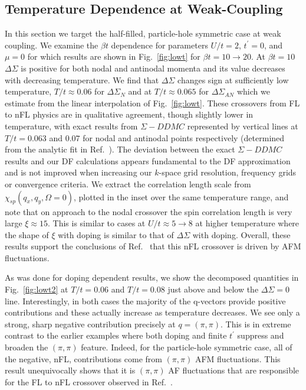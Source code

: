 \documentclass[twocolumn,notitlepage,prb,superscriptaddress,showpacs]{revtex4-1}
\begin{document}
\subsection{Temperature Dependence at Weak-Coupling}
In this section we target the half-filled, particle-hole symmetric case at weak coupling.  We examine the $\beta t$ dependence for parameters $U/t=2$, $t^\prime=0$, and $\mu=0$ for which results are shown in Fig.~\ref{fig:lowt} for $\beta t=10 \to 20$. 
At $\beta t=10$ $\Delta \Sigma$ is positive for both nodal and antinodal momenta and its value decreases with decreasing temperature.
 We find that $\Delta\Sigma$ changes sign at sufficiently low temperature, $T/t\approx0.06$ for $\Delta \Sigma_N$ and at $T/t\approx0.065$ for $\Delta \Sigma_{AN}$ which we estimate from the linear interpolation of Fig.~\ref{fig:lowt}.  
 These crossovers from FL to nFL physics are in qualitative agreement, though slightly lower in temperature, with exact results from $\Sigma-DDMC$\cite{simkovic:2019} represented by vertical lines at $T/t=0.063$ and $0.07$ for nodal and antinodal points respectively (determined from the analytic fit in Ref.~).  The deviation between the exact $\Sigma-DDMC$ results and our DF calculations appears fundamental to the DF approximation and is not improved when increasing our $k$-space grid resolution, frequency grids or convergence criteria.
We extract the correlation length scale from $\chi_{sp}(q_x,q_y,\Omega=0)$, plotted in the inset over the same temperature range, and note that on approach to the nodal crossover the spin correlation length is very large $\xi\approx 15$.  This is similar to cases at  $U/t \approx 5\to 8$ at higher temperature where the shape of $\xi$ with doping is similar to that of $\Delta \Sigma$ with doping.  Overall, these results support the conclusions of Ref.~ that this nFL crossover is driven by AFM fluctuations. 

As was done for doping dependent results, we show the decomposed quantities in Fig.~\ref{fig:lowt2} at $T/t=0.06$ and $T/t=0.08$ just above and below the $\Delta \Sigma=0$ line.  Interestingly, in both cases the majority of the q-vectors provide positive contributions and these actually increase as temperature decreases.  We see only a strong, sharp negative contribution precisely at $q=(\pi,\pi)$.  This is in extreme contrast to the earlier examples where both doping and finite $t^\prime$ suppress and broaden the $(\pi,\pi)$ feature.  Indeed, for the particle-hole symmetric case, all of the negative, nFL, contributions come from $(\pi,\pi)$ AFM fluctuations.  This result unequivocally shows that it is $(\pi,\pi)$ AF fluctuations that are responsible for the FL to nFL crossover observed in Ref.~.
\end{document}
